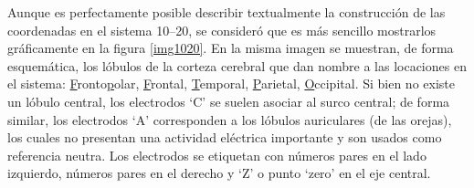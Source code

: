 \documentclass[12pt,letterpaper]{book}
\begin{document}
Aunque es perfectamente posible describir textualmente la construcción de las coordenadas en el sistema 10--20, se consideró que es más sencillo mostrarlos gráficamente en la figura \ref{img1020}.
%
En la misma imagen se muestran, de forma esquemática, los lóbulos de la corteza cerebral que dan nombre a las locaciones en el sistema: \underline{F}ronto\underline{p}olar, \underline{F}rontal, \underline{T}emporal, \underline{P}arietal, \underline{O}ccipital.
%
Si bien no existe un lóbulo central, los electrodos `C' se suelen asociar al surco central; de forma similar, los electrodos `A' corresponden a los lóbulos auriculares (de las orejas), los cuales no presentan una actividad eléctrica importante y son usados como referencia neutra.
%
Los electrodos se etiquetan con números pares en el lado izquierdo, números pares en el derecho y `Z' o punto `zero' en el eje central.
\end{document}
